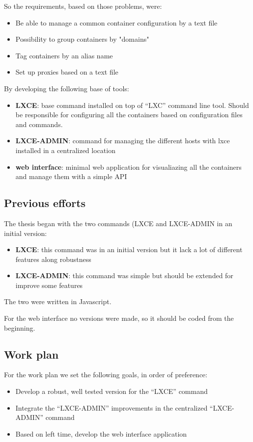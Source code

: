 So the requirements, based on those problems, were:
\begin{itemize}
	\item {Be able to manage a common container configuration by a text file}
	\item {Possibility to group containers by "domains"}
	\item {Tag containers by an alias name}
	\item {Set up proxies based on a text file}
\end{itemize}

By developing the following base of tools:
\begin{itemize}
	\item {\textbf{LXCE}: base command installed on top of ``LXC'' command line tool. Should be responsible for configuring all the containers based on configuration files and commands.}
	\item {\textbf{LXCE-ADMIN}: command for managing the different hosts with lxce installed in a centralized location}
	\item {\textbf{web interface}: minimal web application for visualiazing all the containers and manage them with a simple API}
\end{itemize}


\subsection{Previous efforts}
\label{ssec:previous}
The thesis began with the two commands (LXCE and LXCE-ADMIN in an initial version:
\begin{itemize}
	\item {\textbf{LXCE}: this command was in an initial version but it lack a lot of different features along robustness}
	\item {\textbf{LXCE-ADMIN}: this command was simple but should be extended for improve some features}
\end{itemize}
The two were written in Javascript.

For the web interface no versions were made, so it should be coded from the beginning.

\subsection{Work plan}
\label{ssec:gantt}
For the work plan we set the following goals, in order of preference:
\begin{itemize}
	\item {Develop a robust, well tested version for the ``LXCE'' command}
	\item {Integrate the ``LXCE-ADMIN'' improvements in the centralized ``LXCE-ADMIN'' command}
	\item {Based on left time, develop the web interface application}
\end{itemize}

